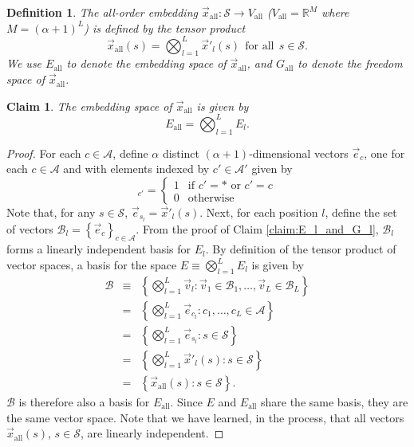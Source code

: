 \documentclass{article}
\numberwithin{myclaim}{section}
\newcommand{\set}[1]{\left\{ #1 \right\}}
\newtheorem{claim}{Claim}
\newtheorem{definition}{Definition}
\begin{document}
\begin{definition}
The all-order embedding $\vec{x}_\mathrm{all}:\mathcal{S} \to V_\mathrm{all}$ ($V_\mathrm{all} = \mathbb{R}^M$ where $M = (\alpha+1)^L$) is defined by the tensor product
\begin{equation}
    \vec{x}_\mathrm{all}(s) = \bigotimes_{l=1}^L \vec{x}'_l(s) ~~\textrm{for all}~~s \in \mathcal{S}.
\end{equation} 
We use $E_\mathrm{all}$ to denote the embedding space of $\vec{x}_\mathrm{all}$, and $G_\mathrm{all}$ to denote the freedom space of $\vec{x}_\mathrm{all}$. 
\end{definition}

\begin{claim} \label{claim:S_all}
     The embedding space of $\vec{x}_\mathrm{all}$ is given by 
     \begin{equation}
        E_\mathrm{all}= \bigotimes_{l=1}^L E_l.       
     \end{equation}
\end{claim}

\begin{proof}
For each $c \in \mathcal{A}$, define $\alpha$ distinct $(\alpha+1)$-dimensional vectors $\vec{e}_c$, one for each $c \in \mathcal{A}$ and with elements indexed by $c' \in \mathcal{A'}$ given by
\begin{equation}
    [\vec{e}_c]_{c'} = \left\{ \begin{array}{rl} 
        1 & \textrm{if $c' = *$ or $c' = c$} \\
        0 & \textrm{otherwise}
     \end{array} \right.
\end{equation}
Note that, for any $s \in \mathcal{S}$, $\vec{e}_{s_l} = \vec{x}'_l(s)$. Next, for each position $l$, define the set of vectors $\mathcal{B}_l = \set{\vec{e}_c}_{c \in \mathcal{A}}$. From the proof of Claim \ref{claim:E_l_and_G_l}, $\mathcal{B}_l$ forms a linearly independent basis for $E_l$. By definition of the tensor product of vector spaces, a basis for the space $E \equiv \bigotimes_{l=1}^L E_l$ is given by
\begin{eqnarray}
    \mathcal{B} &\equiv & \set{\bigotimes_{l=1}^L \vec{v}_l: \vec{v}_1 \in \mathcal{B}_1, \ldots, \vec{v}_L \in \mathcal{B}_L} \\
    &=& \set{\bigotimes_{l=1}^L \vec{e}_{c_l}: c_1, \ldots, c_L \in \mathcal{A}} \\
    &=& \set{\bigotimes_{l=1}^L \vec{e}_{s_l}: s \in \mathcal{S}} \\
    &=& \set{\bigotimes_{l=1}^L \vec{x}'_l(s): s \in \mathcal{S}} \\
    &=& \set{\vec{x}_{\mathrm{all}}(s): s \in \mathcal{S}}.
\end{eqnarray}
$\mathcal{B}$ is therefore also a basis for $E_\mathrm{all}$. Since $E$ and $E_\mathrm{all}$ share the same basis, they are the same vector space. Note that we have learned, in the process, that all vectors $\vec{x}_{\mathrm{all}}(s)$, $s \in \mathcal{S}$, are linearly independent. 
\end{proof}
\end{document}
